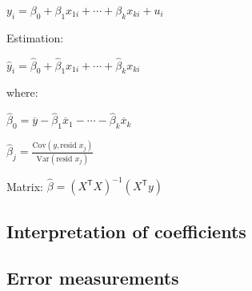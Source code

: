 \documentclass[10pt, a4paper, landscape]{article}
\newcommand{\Var}{\mathrm{Var}}
\newcommand{\Cov}{\mathrm{Cov}}
\newcommand{\tr}{\mathsf{T}}
\begin{document}
\begin{multicols}{3}
\begin{multicols}{2}
			\begin{center}
				$y_{i} = \beta_{0} + \beta_{1} x_{1i} + \cdots + \beta_{k} x_{ki} + u_{i}$
			\end{center}
			
			Estimation:
			
			\begin{center}
				$\hat{y}_{i} = \hat{\beta}_{0} + \hat{\beta}_{1} x_{1i} + \cdots + \hat{\beta}_{k} x_{ki}$
			\end{center}
			
			where:
			
			\begin{center}
				$\hat{\beta}_{0} = \overline{y} - \hat{\beta}_{1} \overline{x}_{1} - \cdots - \hat{\beta}_{k} \overline{x}_{k}$
				
				$\hat{\beta}_{j} = \frac{\Cov(y, \text{resid } x_{j})}{\Var(\text{resid } x_{j})}$
			\end{center}
			
			Matrix: $\hat{\beta} = (X^{\tr} X)^{-1}(X^{\tr} y)$
		\end{multicols}
		
		\subsection*{Interpretation of coefficients}
		
		\begin{center}
		\end{center}
		
		\subsection*{Error measurements}
		

\end{multicols}
\end{document}
